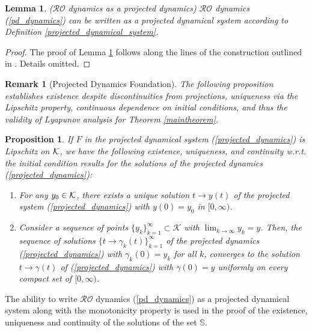 \documentclass[journal,twoside,web]{ieeecolor}
\newcommand{\rev}[1]{#1}
\newtheorem{lemma}{Lemma}
\newtheorem{proposition}[theorem]{Proposition}
\newtheorem{remark}{Remark}
\begin{document}
\begin{lemma} \label{projected} ($\mathcal{RO}$ dynamics as a projected dynamics)
$\mathcal{RO}$ dynamics (\ref{pd_dynamics}) can be written as a projected dynamical system according to Definition \ref{projected_dynamical_system}.
\end{lemma}
\begin{proof}
The proof of Lemma \ref{projected} follows along the lines of the construction outlined in \cite{cherukuri2016}. Details omitted.
\end{proof}

\begin{remark}[\rev{Projected Dynamics Foundation}]
\rev{The following proposition establishes existence despite discontinuities from projections, uniqueness via the Lipschitz property, continuous dependence on initial conditions, and thus the validity of Lyapunov analysis for Theorem \ref{maintheorem}.}
\end{remark}

\begin{proposition} \label{proposition_projected}
If $F$ in the projected dynamical system (\ref{projected_dynamics}) is Lipschitz on ${\cal K}$, we have the following existence, uniqueness, and continuity w.r.t. the initial condition results for the solutions of the projected dynamics (\ref{projected_dynamics}):
\begin{enumerate}
\item For any $y_{0} \in {\cal K}$, there exists a unique solution $t \rightarrow y(t)$ of the projected system (\ref{projected_dynamics}) with $y(0)=y_{0}$ in $[0,\infty)$.
\item Consider a sequence of points $\{y_{k}\}_{k=1}^\infty \subset {\mathcal K}$ with $\lim_{k \rightarrow \infty} y_k=y$. Then, the sequence of solutions $\{t \rightarrow \gamma_k(t)\}_{k=1}^\infty$ of the projected dynamics (\ref{projected_dynamics}) with $\gamma_k(0)=y_k$ for all $k$, converges to the solution $t \rightarrow \gamma(t)$ of (\ref{projected_dynamics}) with $\gamma(0)=y$ uniformly on every compact set of $[0,\infty)$.
\end{enumerate}
\end{proposition}
The ability to write $\mathcal{RO}$ dynamics (\ref{pd_dynamics}) as a projected dynamical system along with the monotonicity property is used in the proof of the existence, uniqueness and continuity of the solutions of the set ${\mathbb S}$.
\end{document}
